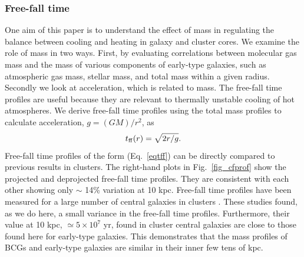 \documentclass[iop]{emulateapj}
\begin{document}
\subsubsection{Free-fall time}
One aim of this paper is to understand the effect of mass in regulating the balance between cooling and heating in galaxy and cluster cores. We examine the role of mass in two ways.  First, by evaluating correlations between molecular gas mass and the mass of various components of early-type galaxies, such as atmospheric gas mass, stellar mass, and total mass within a given radius.  Secondly we look at acceleration, which is related to mass.  The free-fall time profiles are useful because they are relevant to thermally unstable cooling of hot atmospheres.  We derive free-fall time profiles using the total mass profiles to calculate acceleration, $g = (G M)/r^2$, as 
\begin{equation}
t_{\rm ff}(r) = \sqrt{2r/g}.
\label{eqtff}
\end{equation}
Free-fall time profiles of the form (Eq.~\ref{eqtff}) can be directly compared to previous results in clusters. The right-hand plots in Fig.~\ref{fig_cfprof} show the projected and deprojected free-fall time profiles. They are consistent with each other showing only $\sim$ 14\% variation at 10 kpc. Free-fall time profiles have been measured for a large number of central galaxies in clusters \citep{Hogan:17, Hogan:17a, Main:17, Pulido:17}. These studies found, as we do here, a small variance in the free-fall time profiles. Furthermore,  their value at 10 kpc, $\simeq 5\times 10^7$ yr, found in cluster central galaxies are close to those found here for early-type galaxies. This demonstrates that the mass profiles of BCGs and early-type galaxies are similar in their inner few tens of kpc.
\end{document}
